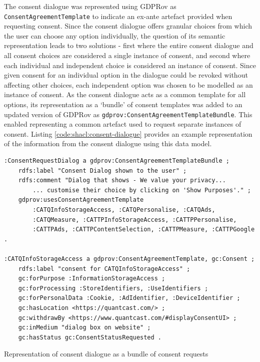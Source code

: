 The consent dialogue was represented using GDPRov as \texttt{ConsentAgreementTemplate} to indicate an ex-ante artefact provided when requesting consent.
Since the consent dialogue offers granular choices from which the user can choose any option individually, the question of its semantic representation leads to two solutions - first where the entire consent dialogue and all consent choices are considered a single instance of consent, and second where each individual and independent choice is considered an instance of consent.
Since given consent for an individual option in the dialogue could be revoked without affecting other choices, each independent option was chosen to be modelled as an instance of consent.
As the consent dialogue acts as a common template for all options, its representation as a `bundle' of consent templates was added to an updated version of GDPRov as \texttt{gdprov:ConsentAgreementTemplateBundle}. This enabled representing a common artefact used to request separate instances of consent.
Listing \autoref{code:shacl:consent-dialogue} provides an example representation of the information from the consent dialogue using this data model.
\begin{listing}[htbp]
\begin{verbatim}
:ConsentRequestDialog a gdprov:ConsentAgreementTemplateBundle ;
    rdfs:label "Consent Dialog shown to the user" ;
    rdfs:comment "Dialog that shows - We value your privacy...
        ... customise their choice by clicking on 'Show Purposes'." ;
    gdprov:usesConsentAgreementTemplate 
        :CATQInfoStorageAccess, :CATQPersonalise, :CATQAds, 
        :CATQMeasure, :CATTPInfoStorageAccess, :CATTPPersonalise, 
        :CATTPAds, :CATTPContentSelection, :CATTPMeasure, :CATTPGoogle .

:CATQInfoStorageAccess a gdprov:ConsentAgreementTemplate, gc:Consent ;
    rdfs:label "consent for CATQInfoStorageAccess" ;
    gc:forPurpose :InformationStorageAccess ;
    gc:forProcessing :StoreIdentifiers, :UseIdentifiers ;
    gc:forPersonalData :Cookie, :AdIdentifier, :DeviceIdentifier ;
    gc:hasLocation <https://quantcast.com/> ;
    gc:withdrawBy <https://www.quantcast.com/#displayConsentUI> ;
    gc:inMedium "dialog box on website" ;
    gc:hasStatus gc:ConsentStatusRequested .
\end{verbatim}
\caption{Representation of consent dialogue as a bundle of consent requests}
\label{code:shacl:consent-dialogue}
\end{listing}


